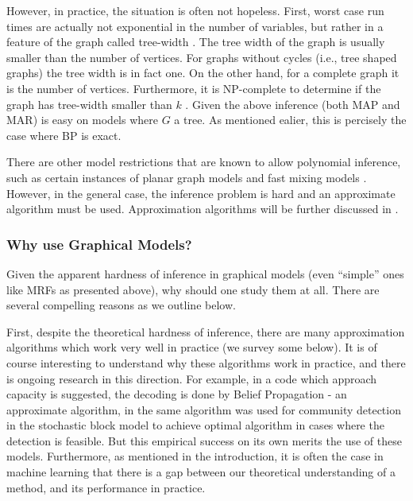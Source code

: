 However, in practice, the situation is often not hopeless. First, worst case run times are actually not exponential in the number of variables, but rather in a feature of the graph called tree-width  \cite{robertson1983graph,robertson1994quickly}.
The tree width of the graph is usually smaller than the number of vertices. For graphs without cycles (i.e., tree shaped graphs) the tree width is in fact one. On the other hand, for a complete graph it is the number of vertices. Furthermore, it is NP-complete to determine if the graph has tree-width smaller than $k$  \cite{Arnborg:1987}.
Given the above inference (both MAP and MAR) is easy on models where $G$ a tree. As mentioned ealier, this is percisely the case where BP is exact.

There are other model restrictions that are known to allow polynomial
inference, such as certain instances of planar graph models  \cite{jaakkola2007approximate} and
fast mixing models  \cite{jerrum1993polynomial}.  However, in the
general case, the inference problem is hard and an approximate
algorithm must be used. Approximation algorithms will be further discussed in
.

\subsubsection{Why use Graphical Models?}
 
Given the apparent hardness of inference in graphical models (even ``simple'' ones like MRFs as presented above), why should
one study them at all. There are several compelling reasons as we outline below.

First, despite the theoretical hardness of inference, there are many approximation algorithms which work very well in practice (we survey some below). It is of course interesting to understand why these algorithms work in practice, and there is ongoing research in this direction.
For example, in \cite{richardson2001design} a code which approach capacity is suggested, the decoding is done by Belief Propagation - an approximate algorithm, in \cite{decelle2011inference} the same algorithm was used for community detection in the stochastic block model to achieve optimal algorithm in cases where the detection is feasible.    
But this empirical success on its own merits the use of these models. Furthermore, as mentioned in the introduction, it is often the case in machine learning that there is a gap between our theoretical understanding of a method, and its performance in practice.

